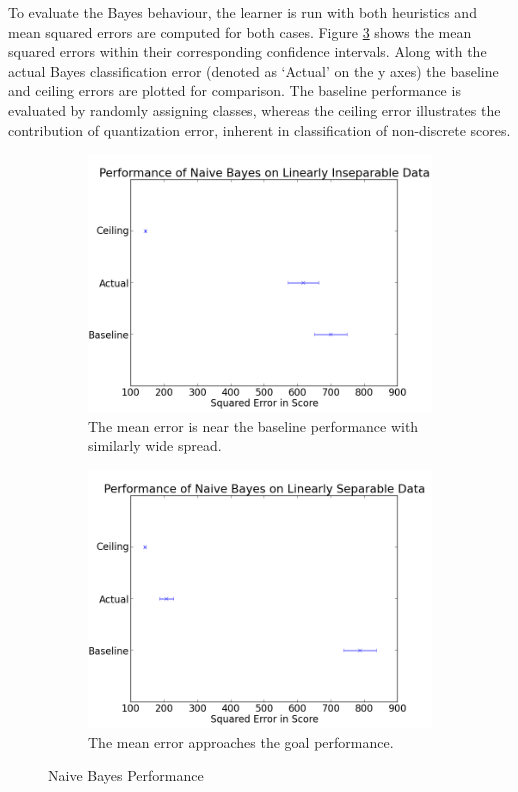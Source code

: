 \documentclass[12pt,a4paper,notitlepage,twoside]{scrbook}
\begin{document}
To evaluate the Bayes behaviour, the learner is run with both heuristics and mean squared
errors are computed for both cases.  Figure \ref{fig:bayes_perf} shows the mean squared
errors within their corresponding confidence intervals.  Along with the actual Bayes
classification error (denoted as `Actual' on the y axes) the baseline and ceiling errors
are plotted for comparison. The baseline performance is evaluated by randomly assigning
classes, whereas the ceiling error illustrates the contribution of quantization error,
inherent in classification of non-discrete scores.

\begin{figure}[h]
  \begin{subfigure}[b]{0.49\textwidth}
    \centering
 \includegraphics[width=\linewidth]{figs/insep.png}
 \caption{The mean error is near the baseline performance
 with similarly wide spread. \label{insep}}
\end{subfigure}
\quad
\begin{subfigure}[b]{0.49\textwidth}
  \centering
  \includegraphics[width=\linewidth]{figs/sep.png}
  \caption{The mean error
  approaches the goal performance. \label{sep}}
\end{subfigure}
\caption{Naive Bayes Performance \label{fig:bayes_perf}}
\end{figure}
\end{document}
